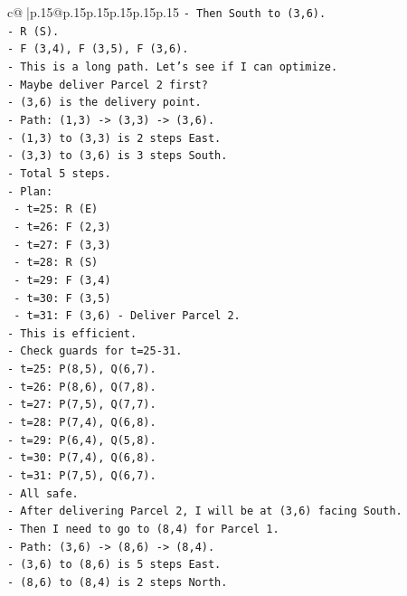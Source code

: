 \documentclass{article}
\begin{document}
{\begin{supertabular}{c@{$\;$}|p{.15\linewidth}@{}p{.15\linewidth}p{.15\linewidth}p{.15\linewidth}p{.15\linewidth}p{.15\linewidth}}
{{{\texttt{{-} Then South to (3,6).} \\
\texttt{{-} R (S).} \\
\texttt{{-} F (3,4), F (3,5), F (3,6).} \\
\texttt{{-} This is a long path. Let's see if I can optimize.} \\
\texttt{{-} Maybe deliver Parcel 2 first?} \\
\texttt{{-} (3,6) is the delivery point.} \\
\texttt{{-} Path: (1,3) {-}> (3,3) {-}> (3,6).} \\
\texttt{{-} (1,3) to (3,3) is 2 steps East.} \\
\texttt{{-} (3,3) to (3,6) is 3 steps South.} \\
\texttt{{-} Total 5 steps.} \\
\texttt{{-} Plan:} \\
\texttt{  {-} t=25: R (E)} \\
\texttt{  {-} t=26: F (2,3)} \\
\texttt{  {-} t=27: F (3,3)} \\
\texttt{  {-} t=28: R (S)} \\
\texttt{  {-} t=29: F (3,4)} \\
\texttt{  {-} t=30: F (3,5)} \\
\texttt{  {-} t=31: F (3,6) {-} Deliver Parcel 2.} \\
\texttt{{-} This is efficient.} \\
\texttt{{-} Check guards for t=25{-}31.} \\
\texttt{{-} t=25: P(8,5), Q(6,7).} \\
\texttt{{-} t=26: P(8,6), Q(7,8).} \\
\texttt{{-} t=27: P(7,5), Q(7,7).} \\
\texttt{{-} t=28: P(7,4), Q(6,8).} \\
\texttt{{-} t=29: P(6,4), Q(5,8).} \\
\texttt{{-} t=30: P(7,4), Q(6,8).} \\
\texttt{{-} t=31: P(7,5), Q(6,7).} \\
\texttt{{-} All safe.} \\
\texttt{{-} After delivering Parcel 2, I will be at (3,6) facing South.} \\
\texttt{{-} Then I need to go to (8,4) for Parcel 1.} \\
\texttt{{-} Path: (3,6) {-}> (8,6) {-}> (8,4).} \\
\texttt{{-} (3,6) to (8,6) is 5 steps East.} \\
\texttt{{-} (8,6) to (8,4) is 2 steps North.} \\
}}}
\end{supertabular}}
\end{document}
